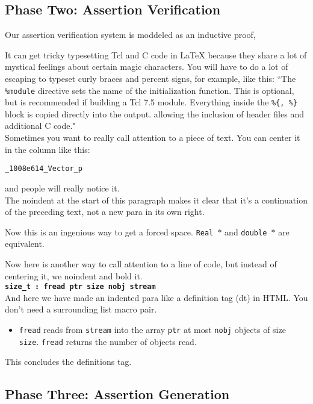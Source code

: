 \documentclass[letterpaper,twocolumn,10pt]{article}
\begin{document}
\subsection{Phase Two: Assertion Verification}

Our assertion verification system is moddeled as an inductive proof,


It can get tricky typesetting Tcl and C code in LaTeX because they share
a lot of mystical feelings about certain magic characters.  You
will have to do a lot of escaping to typeset curly braces and percent
signs, for example, like this:
``The {\tt \%module} directive
sets the name of the initialization function.  This is optional, but is
recommended if building a Tcl 7.5 module.
Everything inside the {\tt \%\{, \%\}}
block is copied directly into the output. allowing the inclusion of
header files and additional C code." \\

Sometimes you want to really call attention to a piece of text.  You
can center it in the column like this:
\begin{center}
{\tt \_1008e614\_Vector\_p}
\end{center}
and people will really notice it.\\

\noindent
The noindent at the start of this paragraph makes it clear that it's
a continuation of the preceding text, not a new para in its own right.


Now this is an ingenious way to get a forced space.
{\tt Real~$*$} and {\tt double~$*$} are equivalent. 

Now here is another way to call attention to a line of code, but instead
of centering it, we noindent and bold it.\\

\noindent
{\bf \tt size\_t : fread ptr size nobj stream } \\

And here we have made an indented para like a definition tag (dt)
in HTML.  You don't need a surrounding list macro pair.
\begin{itemize}
\item[]  {\tt fread} reads from {\tt stream} into the array {\tt ptr} at
most {\tt nobj} objects of size {\tt size}.   {\tt fread} returns
the number of objects read. 
\end{itemize}
This concludes the definitions tag.

\subsection{Phase Three: Assertion Generation}
\end{document}
